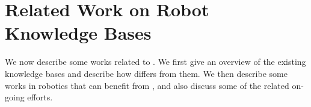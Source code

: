 \section{Related Work on Robot Knowledge Bases}
\label{sec:relatedwork}
We now describe some works related to \robobrain{}. We first give an overview of the existing knowledge bases and describe how \robobrain{} differs from them. We then describe some works in robotics that can benefit from \robobrain{}, and also discuss some of the related on-going efforts.

\smallskip



\smallskip



